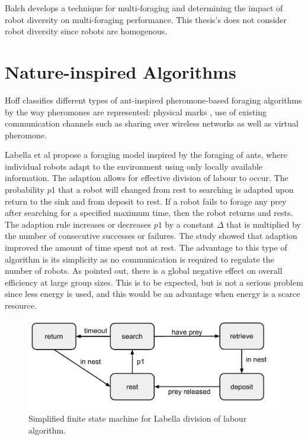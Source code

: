 Balch \cite{balch1999impact} develops a technique for multi-foraging and determining the impact of robot diversity on multi-foraging performance. This thesis's does not consider robot diversity since robots are homogenous.
  
  
\section{Nature-inspired Algorithms}

Hoff \cite{hoff2010two} classifies different types of ant-inspired pheromone-based foraging algorithms by the way pheromones are represented: physical marks \cite{alcoholfromants2012}, use of existing communication channels such as sharing over wireless networks as well as virtual pheromone. %

Labella et al \cite{labella2006division} propose a foraging model inspired by the foraging of ants, where individual robots adapt to the environment using only locally available information. The adaption allows for effective division of labour to occur. The probability $p1$ that a robot will changed from rest to searching is adapted upon return to the sink and from deposit to rest. If a robot fails to forage any prey after searching for a specified maximum time, then the robot returns and rests. 
The adaption rule increases or decreases $p1$ by a constant $\Delta$ that is multiplied by the number of consecutive successes or failures. The study showed that adaption improved the amount of time spent not at rest. The advantage to this type of algorithm is its simplicity as no communication is required to regulate the number of robots. As pointed out, there is a global negative effect on overall efficiency at large group sizes. This is to be expected, but is not a serious problem since less energy is used, and this would be an advantage when energy is a scarce resource. %

\begin{figure}
\includegraphics[width=\textwidth]{chapters/chapter2/figures/LabellaFSM.pdf}
\caption{Simplified finite state machine for Labella division of labour algorithm. }
\end{figure} 

